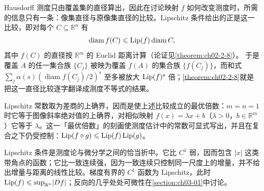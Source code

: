 \documentclass[../../main.tex]{subfiles}%
\begin{document}
\begin{remark}\label{remark:ch02-def-2-4-动机}
Hausdorff 测度只由覆盖集的直径算出，因此在讨论映射 $f$ 如何改变测度时，所需的信息只有一条：像集直径与原像集直径的比较。Lipschitz 条件给出的正是这一比较，即对每个 $C\subseteq\mathbb{R}^n$ 有
\begin{align*}
\operatorname{diam}f(C)\leqslant\operatorname{Lip}(f)\operatorname{diam}C ,
\end{align*}
其中 $f(C)$ 的直径按 $\mathbb{R}^m$ 的 Euclid 距离计算（论证见\cref{theorem:ch02-2-8}）。%
于是覆盖 $A$ 的任一集合族 $\{C_j\}$ 被映为覆盖 $f(A)$ 的集合族 $\{f(C_j)\}$，而和式 $\sum_j\alpha(s)(\operatorname{diam}f(C_j)/2)^s$ 至多被放大 $\operatorname{Lip}(f)^s$ 倍；\cref{theorem:ch02-2-8}就是把这一直径比较逐字翻译成测度不等式的结果。%

Lipschitz 常数取为差商的上确界，因而是使上述比较成立的最优倍数：$m=n=1$ 时它等于图像斜率绝对值的上确界，对相似映射 $f(x)=\lambda x+b$（$\lambda>0$，$b\in\mathbb{R}^m$）它等于 $\lambda$。这一「最优倍数」的刻画使测度估计中的常数可显式写出，并且在复合之下仍受控制：$\operatorname{Lip}(f\circ g)\leqslant\operatorname{Lip}(f)\operatorname{Lip}(g)$。

Lipschitz 条件是测度论与微分学之间的恰当折中。它比 $C^1$ 弱，因而包含 $\lvert x\rvert$ 这类带角点的函数；它比一致连续强，因为一致连续只控制同一尺度上的增量，并不给出增量与距离的线性比较。梯度有界的 $C^1$ 函数为 Lipschitz，此时 $\operatorname{Lip}(f)\leqslant\sup_{\mathbb{R}^n}\lvert Df\rvert$；反向的几乎处处可微性在\cref{section:ch03-01}中讨论。%
\end{remark}
\end{document}
